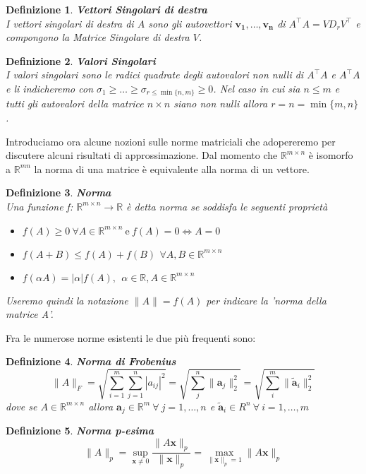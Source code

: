 \documentclass[11pt]{article}
\newtheorem{definition}{Definizione}
\newcommand{\R}{\mathbb{R}}
\begin{document}
\begin{definition}
	\textbf{Vettori Singolari di destra}\\ I vettori singolari di destra di $A$ sono gli autovettori $\mathbf{v_1, \dots ,v_n}$ di $A^\top  A=V D_rV^\top$ e compongono la \textit{Matrice Singolare di destra} $V$.
\end{definition}
\begin{definition}\textbf{Valori Singolari}\\ 
I valori singolari sono le radici quadrate degli autovalori non nulli di $A^\top      A$ e $A^\top  A$ e li indicheremo con	$\sigma_1 \geq \dots \geq \sigma_{r \leq \min\{n,m\}} \geq 0$. Nel caso in cui sia \(n \leq m \) e  tutti gli autovalori della matrice \(n \times n\) siano non nulli allora $r=n=\min{\{m,n\}}$.
\end{definition} 
\noindent
Introduciamo ora alcune nozioni sulle norme matriciali che adopereremo per discutere alcuni risultati di approssimazione.
Dal momento che $\R^{m \times n}$ è isomorfo a $\R^{mn}$ la norma di una matrice è equivalente alla norma di un vettore. 
\begin{definition}
	\textbf{Norma}\\ Una funzione f: $\R^{m \times n} \rightarrow \R$ è detta norma se soddisfa le seguenti proprietà
	\begin{itemize}
		\item $f(A) \geq 0 \ \forall A\in \R^{m \times n} \ \text{e} \  f(A)=0 \iff A=0 $
		\item $f(A+B)\leq f(A)+f(B)\  \, \forall A,B \in \R^{m \times n}$ 
		\item $f(\alpha A)=|\alpha|f(A), \ \ \alpha \in \R, A \in \R^{m \times n}$
	\end{itemize}
Useremo quindi la notazione $\|A\|=f(A)$ per indicare la 'norma della matrice A'. 
\end{definition}
\noindent 
Fra le numerose norme esistenti le due più frequenti sono:
\begin{definition}
\textbf{Norma di Frobenius}\\
$$\|A\|_F=\sqrt{\sum_{i=1}^m\sum_{j=1}^n|a_{ij}|^2}=\sqrt{\sum_j^n \|\mathbf{a}_j\|_2^2}= \sqrt{\sum_i^m \|\mathbf{\tilde{a}}_i\|_2^2}$$ dove se \(A \in \R^{m \times n}\) allora \(\mathbf{a}_j \in \R^m \ \forall \ j=1, \dots, n \) e \(\mathbf{\tilde{a}}_i \in R^n \ \forall \ i=1, \dots,m \) 
\end{definition}
\begin{definition}
\textbf{Norma p-esima}\\
$$ \|A\|_p = \sup_{\mathbf{x} \neq 0} \frac{\|A\mathbf{x}\|_p}{\|\mathbf{x}\|_p}=\max_{\|\mathbf{x}\|_p =1} \|A\mathbf{x}\|_p
$$
\end{definition}
\end{document}
